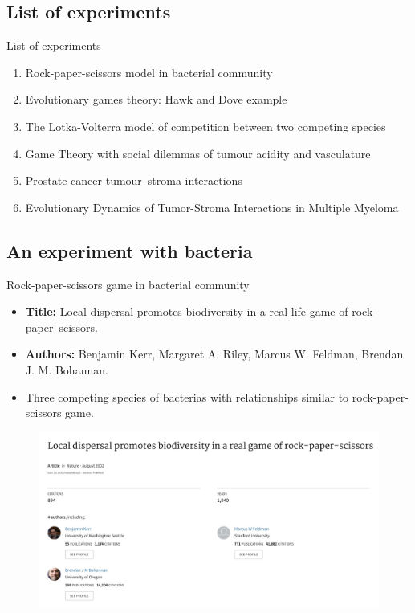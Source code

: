 \subsection{List of experiments}

\begin{frame}{List of experiments}
	\begin{enumerate}
		\item <alert@2> Rock-paper-scissors model in bacterial community
		\item Evolutionary games theory: Hawk and Dove example
		\item The Lotka-Volterra model of competition between two competing species
		\item Game Theory with social dilemmas of tumour acidity and vasculature
		\item Prostate cancer tumour–stroma interactions
		\item <alert@2> Evolutionary Dynamics of Tumor-Stroma Interactions in Multiple Myeloma
	\end{enumerate}
\end{frame}

\subsection{An experiment with bacteria}

\begin{frame}{Rock-paper-scissors game in bacterial community}

    \begin{itemize}
        \item \textbf{Title:} Local dispersal promotes biodiversity in a real-life game of rock–paper–scissors.
        \item \textbf{Authors:} Benjamin Kerr, Margaret A. Riley, Marcus W. Feldman, Brendan J. M. Bohannan.
        \item Three competing species of bacterias with relationships similar to rock-paper-scissors game.
    \end{itemize}
            \begin{figure}[t]
    			\includegraphics[scale=0.7]{img/paper_bacteria.jpg}
    		\end{figure}
\end{frame}

